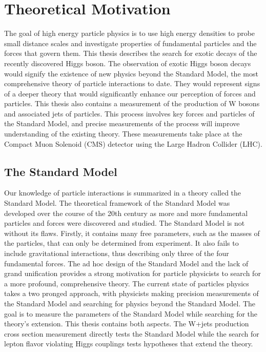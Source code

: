 \documentclass[oneside, letterpaper, oldfontcommands]{memoir}
\begin{document}
\chapter{Theoretical Motivation}\label{theory}
\qquad The goal of high energy particle physics is to use high energy densities to probe small distance scales and investigate properties of fundamental particles and the forces that govern them. This thesis describes the search for exotic decays of the recently discovered Higgs boson. The observation of exotic Higgs boson decays would signify the existence of new physics beyond the Standard Model, the most comprehensive theory of particle interactions to date. They would represent signs of a deeper theory that would significantly enhance our perception of forces and particles. This thesis also contains a measurement of the production of W bosons and associated jets of particles. This process involves key forces and particles of the Standard Model, and precise measurements of the process will improve understanding of the existing theory. These measurements take place at the Compact Muon Solenoid (CMS) detector using the Large Hadron Collider (LHC). 

\section{The Standard Model}\label{sm}

\qquad Our knowledge of particle interactions is summarized in a theory called the Standard Model. The theoretical framework of the Standard Model was developed over the course of the 20th century as more and more fundamental particles and forces were discovered and studied. The Standard Model is not without its flaws. Firstly, it contains many free parameters, such as the masses of the particles, that can only be determined from experiment. It also fails to include gravitational interactions, thus describing only three of the four fundamental forces. The ad hoc design of the Standard Model and the lack of grand unification provides a strong motivation for particle physicists to search for a more profound, comprehensive theory. The current state of particles physics takes a two pronged approach, with physicists making precision measurements of the Standard Model and searching for physics beyond the Standard Model. The goal is to measure the parameters of the Standard Model while searching for the theory's extension. This thesis contains both aspects. The W+jets production cross section measurement directly tests the Standard Model while the search for lepton flavor violating Higgs couplings tests hypotheses that extend the theory.
\end{document}
